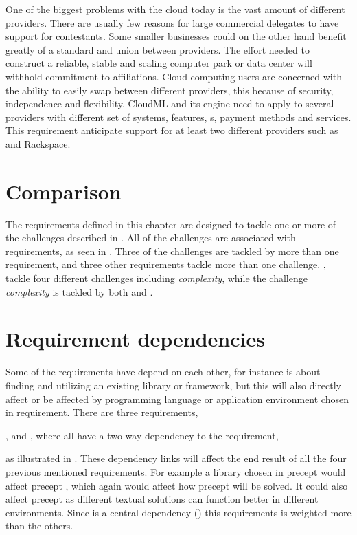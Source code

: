 One of the biggest problems with the cloud today is the vast amount of different providers. 
There are usually few reasons for large commercial delegates to have support for contestants. 
Some smaller businesses could on the other hand benefit greatly of a standard and union 
between providers.
The effort needed to construct a reliable, stable and scaling computer park or data center will 
withhold commitment to affiliations. 
Cloud computing users are concerned with the ability to easily swap between different providers, 
this because of security, 
independence and flexibility. 
CloudML and its engine need to apply to several providers with different set of systems, 
features, s, payment methods and services. 
This requirement anticipate support for at least two different providers such as  and Rackspace.

\section{Comparison}


The requirements defined in this chapter are designed to tackle one or more of the challenges
described in .
All of the challenges are associated with requirements, as seen in .
Three of the challenges are tackled by more than one requirement, and three other requirements
tackle more than one challenge.
\eg,  tackle four different challenges including \emph{complexity},
while the challenge \emph{complexity} is tackled by both 
 and .

\section{Requirement dependencies}


Some of the requirements have depend on each other, for instance  is about finding
and utilizing an existing library or framework, but this will also directly affect or be affected by
programming language or application environment chosen in  requirement.
There are three requirements, 
\begin{ii}
  \iitem {},
  \iitem {} and
  \iitem {},
    where all have a two-way dependency to the 
  \iitem {} requirement,
\end{ii}
as illustrated in .
These dependency links will affect the end result of all the four previous mentioned requirements.
For example a library chosen in precept  would affect precept , which again would affect
how precept  will be solved. 
It could also affect precept  as different textual solutions can function better in
different environments.
Since  is a central dependency ()
this requirements is weighted more than the others.

